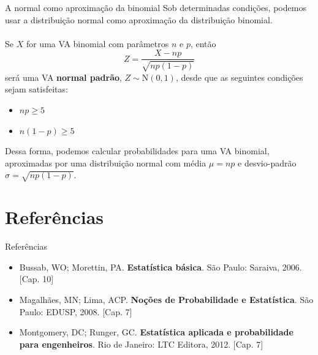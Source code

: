 \documentclass[10pt]{beamer}\usepackage[]{graphicx}\usepackage[]{color}
\providecommand{\N}{\text{N}}
\theoremstyle{definition}
\begin{document}
\begin{frame}{A normal como aproximação da binomial}
  Sob determinadas condições, podemos usar a distribuição normal como
  aproximação da distribuição binomial. \\~\\
  Se $X$ for uma VA binomial com parâmetros $n$ e $p$, então
  \begin{equation*}
    Z = \frac{X - np}{\sqrt{np(1-p)}}
  \end{equation*}
  será uma VA \textbf{normal padrão}, $Z \sim \N(0,1)$, desde que as
  seguintes condições sejam satisfeitas:
  \begin{itemize}
  \item $np \geq 5$
  \item $n(1-p) \geq 5$
  \end{itemize}
  Dessa forma, podemos calcular probabilidades para uma VA binomial,
  aproximadas por uma distribuição normal com média $\mu = np$ e
  desvio-padrão $\sigma = \sqrt{np(1-p)}$.
\end{frame}

\section{Referências}

\begin{frame}{Referências}
  \begin{itemize}
  \item Bussab, WO; Morettin, PA. \textbf{Estatística básica}. São
    Paulo: Saraiva, 2006. [Cap. 10]
  \item Magalhães, MN; Lima, ACP. \textbf{Noções de Probabilidade e
      Estatística}. São Paulo: EDUSP, 2008. [Cap. 7]
  \item Montgomery, DC; Runger, GC. \textbf{Estatística aplicada e
      probabilidade para engenheiros}. Rio de Janeiro: LTC Editora,
    2012. [Cap. 7]
  \end{itemize}
\end{frame}
\end{document}
